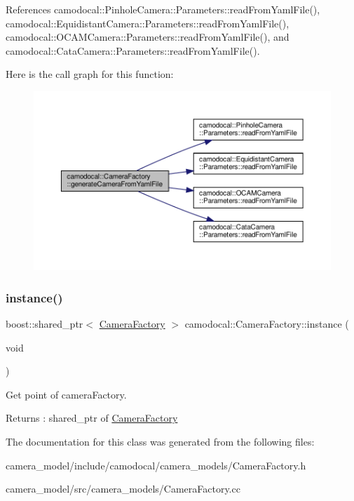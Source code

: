 References camodocal\+::\+Pinhole\+Camera\+::\+Parameters\+::read\+From\+Yaml\+File(), camodocal\+::\+Equidistant\+Camera\+::\+Parameters\+::read\+From\+Yaml\+File(), camodocal\+::\+O\+C\+A\+M\+Camera\+::\+Parameters\+::read\+From\+Yaml\+File(), and camodocal\+::\+Cata\+Camera\+::\+Parameters\+::read\+From\+Yaml\+File().

Here is the call graph for this function\+:\nopagebreak
\begin{figure}[H]
\begin{center}
\leavevmode
\includegraphics[width=350pt]{classcamodocal_1_1CameraFactory_a8362492960d68a4ae43c40a1952df3a5_cgraph}
\end{center}
\end{figure}
\mbox{\label{classcamodocal_1_1CameraFactory_a64645e95b821303ea4b550cb18f2641c}} 
\subsubsection{\texorpdfstring{instance()}{instance()}}
{\footnotesize\ttfamily boost\+::shared\+\_\+ptr$<$ \hyperlink{classcamodocal_1_1CameraFactory}{Camera\+Factory} $>$ camodocal\+::\+Camera\+Factory\+::instance (\begin{DoxyParamCaption}\item[{void}]{ }\end{DoxyParamCaption})\hspace{0.3cm}{\ttfamily [static]}}



Get point of camera\+Factory. 

\begin{DoxyReturn}{Returns}
\+: shared\+\_\+ptr of \hyperlink{classcamodocal_1_1CameraFactory}{Camera\+Factory} 
\end{DoxyReturn}


The documentation for this class was generated from the following files\+:\begin{DoxyCompactItemize}
\item 
camera\+\_\+model/include/camodocal/camera\+\_\+models/Camera\+Factory.\+h\item 
camera\+\_\+model/src/camera\+\_\+models/Camera\+Factory.\+cc\end{DoxyCompactItemize}
